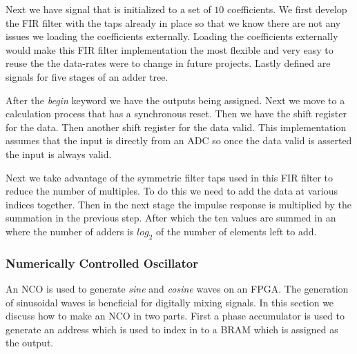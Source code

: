 Next we have signal that is initialized to a set of $10$ coefficients. We first develop the \ac{FIR} filter with the taps already in place so that we know there are not any issues we loading the coefficients externally. Loading the coefficients externally would make this \ac{FIR} filter implementation the most flexible and very easy to reuse the the data-rates were to change in future projects. Lastly defined are signals for five stages of an adder tree.

After the \emph{begin} keyword we have the outputs being assigned. Next we move to a calculation process that has a synchronous reset. Then we have the shift register for the data. Then another shift register for the data valid. This implementation assumes that the input is directly from an \ac{ADC} so once the data valid is asserted the input is always valid. 

Next we take advantage of the symmetric filter taps used in this \ac{FIR} filter to reduce the number of multiples. To do this we need to add the data at various indices together. Then in the next stage the impulse response is multiplied by the summation in the previous step. After which the ten values are summed in an  where the number of adders is $log_2$ of the number of elements left to add. 
	
\subsubsection{Numerically Controlled Oscillator}
	
An \ac{NCO} is used to generate \emph{sine} and \emph{cosine} waves on an \ac{FPGA}. The generation of sinusoidal waves is beneficial for digitally mixing signals. In this section we discuss how to make an \ac{NCO} in two parts. First a phase accumulator is used to generate an address which is used to index in to a \ac{BRAM} which is assigned as the output. 

